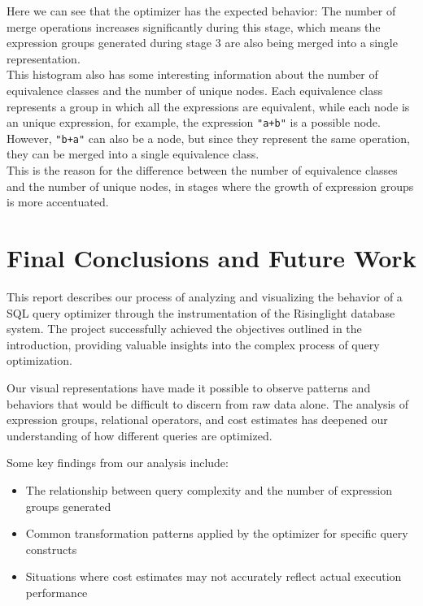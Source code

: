 \documentclass[a4paper,12pt]{scrreprt}
\begin{document}
Here we can see that the optimizer has the expected behavior: The number of merge operations increases significantly during this stage, which means the expression groups generated during stage 3 are also being merged into a single representation. \\

This histogram also has some interesting information about the number of equivalence classes and the number of unique nodes. Each equivalence class represents a group in which all the expressions are equivalent, while each node is an unique expression, for example, the expression \texttt{"a+b"} is a possible node.\\ 
However, \texttt{"b+a"} can also be a node, but since they represent the same operation, they can be merged into a single equivalence class. \\
This is the reason for the difference between the number of equivalence classes and the number of unique nodes, in stages where the growth of expression groups is more accentuated. \\


\chapter{Final Conclusions and Future Work} \label{chap:concl}
This report describes our process of analyzing and visualizing the behavior of a SQL query optimizer through the instrumentation of the Risinglight database system. The project successfully achieved the objectives outlined in the introduction, providing valuable insights into the complex process of query optimization.

Our visual representations have made it possible to observe patterns and behaviors that would be difficult to discern from raw data alone. The analysis of expression groups, relational operators, and cost estimates has deepened our understanding of how different queries are optimized.

Some key findings from our analysis include:
\begin{itemize}
    \item The relationship between query complexity and the number of expression groups generated
    \item Common transformation patterns applied by the optimizer for specific query constructs
    \item Situations where cost estimates may not accurately reflect actual execution performance
\end{itemize}
\end{document}
